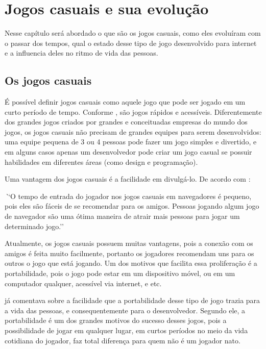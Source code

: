 \section{Jogos casuais e sua evolução}

Nesse capítulo será abordado o que são os jogos casuais, como eles
evoluíram com o passar dos tempos, qual o estado desse tipo de jogo
desenvolvido para internet e a influencia deles no ritmo de vida das
pessoas.

\subsection{Os jogos casuais}

É possível definir jogos casuais como aquele jogo que pode ser jogado em um curto período
de tempo. Conforme , são jogos rápidos e acessíveis.
Diferentemente dos grandes jogos criados por grandes e conceituadas
empresas do mundo dos jogos, os jogos casuais não precisam de grandes
equipes para serem desenvolvidos: uma equipe pequena de 3 ou 4 pessoas
pode fazer um jogo simples e divertido, e em alguns casos apenas um
desenvolvedor pode criar um jogo casual se possuir habilidades em
diferentes áreas (como design e programação).

Uma vantagem dos jogos casuais é a facilidade em divulgá-lo. De acordo com
:

\begin{singlespacing}
\begin{citacao}{4cm}{0cm}\footnotesize \emph
    ``O tempo de entrada do jogador nos jogos casuais em navegadores é pequeno,
    pois eles são fáceis de se recomendar para os amigos. Pessoas jogando
    algum jogo de navegador são uma ótima maneira de atrair mais
    pessoas para jogar um determinado jogo.''
\end{citacao}
\end{singlespacing}

Atualmente, os jogos casuais possuem muitas vantagens, pois a conexão
com os amigos é feita muito facilmente, portanto os jogadores
recomendam uns para os outros o jogo que está jogando. Um dos motivos
que facilita essa proliferação é a portabilidade, pois o jogo pode
estar em um dispositivo móvel, ou em um computador qualquer, acessível
via internet, e etc.

 já comentava sobre a facilidade que a
portabilidade desse tipo de jogo trazia para a vida das pessoas, e
consequentemente para o desenvolvedor. Segundo ele, a portabilidade é um
dos grandes motivos do sucesso desses jogos, pois a possibilidade de
jogar em qualquer lugar, em curtos períodos no meio da vida cotidiana
do jogador, faz total diferença para quem não é um jogador nato.

